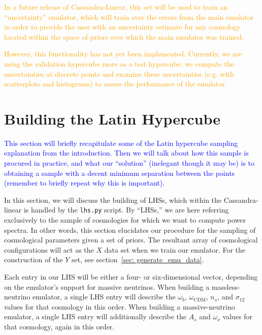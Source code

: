 \textcolor{orange}{In a future
release of Cassandra-Linear, this set will be used to train an ``uncertainty''
emulator, which will train over the errors from the main emulator in order to
provide the user with an uncertainty estimate for any cosmology located within 
the space of priors over which the main emulator was trained.} 

\textcolor{orange}{However, this functionality has not yet been implemented. 
Currently, we are 
using the validation hypercube more as a test hypercube: we compute the uncertainties at discrete points and examine these uncertainties (e.g. with
scatterplots and histograms) to assess the performance of the emulator.}

\section{Building the Latin Hypercube}
\label{sec: build_lhc}


\textcolor{blue}{This section will briefly recapitulate some of the Latin hypercube sampling
explanation from the introduction. Then we will talk about how this sample is
procured in practice, and what our ``solution'' (inelegant though it may be)
is to obtaining a sample with a decent minimum separation between the points
(remember to briefly repeat why this is important).}

In this section, we will discuss the building of LHSs, which within the
Cassandra-linear is handled by the \verb|lhs.py| script.
By ``LHSs,'' we are here referring exclusively to the
sample of cosmologies for which we want to compute power spectra. In other 
words, this section elucidates our procedure for the sampling of cosmological 
parameters given a set of priors. The resultant array of cosmological
configurations will act as the $X$ data set when we train our emulator. For 
the construction of the $Y$ set, see section~\ref{sec: generate_emu_data}.

Each entry in our LHS will be either a four- or six-dimensional vector, 
depending on the emulator's support for massive neutrinos. When building a
massless-neutrino emulator, a single LHS entry will describe the $\omega_b$,
$\omega_\text{CDM}$, $n_s$, and $\sigma_{12}$ values for that cosmology in 
this order. When building a massive-neutrino emulator, a single LHS entry will 
additionally describe the $A_s$ and $\omega_\nu$ values for that cosmology, 
again in this order.

